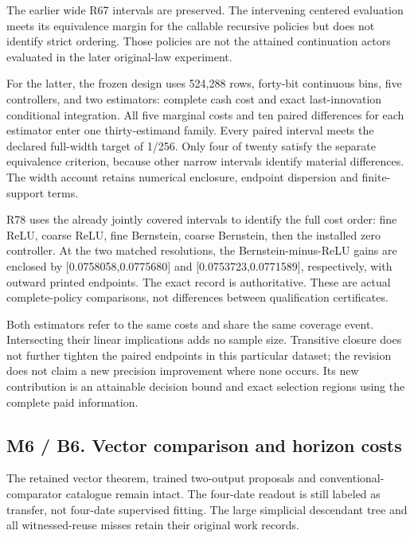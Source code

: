 The earlier wide R67 intervals are preserved. The intervening centered
evaluation meets its equivalence margin for the callable recursive
policies but does not identify strict ordering. Those policies are not
the attained continuation actors evaluated in the later original-law
experiment.

For the latter, the frozen design uses 524,288 rows, forty-bit
continuous bins, five controllers, and two estimators: complete cash
cost and exact last-innovation conditional integration. All five
marginal costs and ten paired differences for each estimator enter one
thirty-estimand family. Every paired interval meets the declared
full-width target of 1/256. Only four of twenty satisfy the separate
equivalence criterion, because other narrow intervals identify material
differences. The width account retains numerical enclosure, endpoint
dispersion and finite-support terms.

R78 uses the already jointly covered intervals to identify the full cost
order: fine ReLU, coarse ReLU, fine Bernstein, coarse Bernstein, then
the installed zero controller. At the two matched resolutions, the
Bernstein-minus-ReLU gains are enclosed by {[}0.0758058,0.0775680{]} and
{[}0.0753723,0.0771589{]}, respectively, with outward printed endpoints.
The exact record is authoritative. These are actual complete-policy
comparisons, not differences between qualification certificates.

Both estimators refer to the same costs and share the same coverage
event. Intersecting their linear implications adds no sample size.
Transitive closure does not further tighten the paired endpoints in this
particular dataset; the revision does not claim a new precision
improvement where none occurs. Its new contribution is an attainable
decision bound and exact selection regions using the complete paid
information.

\hypertarget{m6-b6.-vector-comparison-and-horizon-costs}{%
\subsection{M6 / B6. Vector comparison and horizon
costs}\label{m6-b6.-vector-comparison-and-horizon-costs}}

The retained vector theorem, trained two-output proposals and
conventional-comparator catalogue remain intact. The four-date readout
is still labeled as transfer, not four-date supervised fitting. The
large simplicial descendant tree and all witnessed-reuse misses retain
their original work records.


